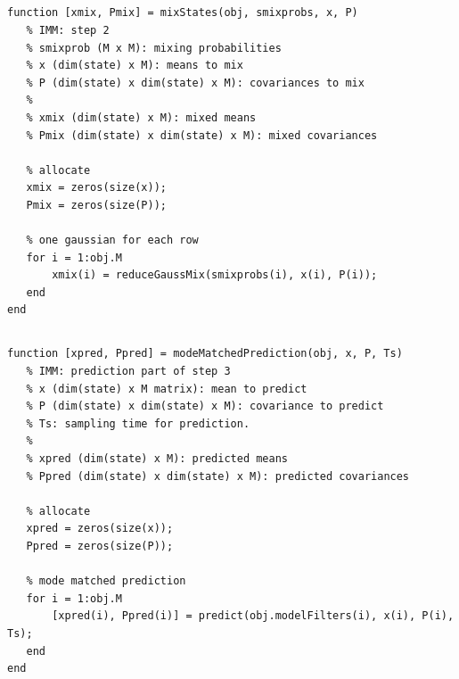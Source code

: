 \documentclass[]{article}
\begin{document}
\subsection{}
\begin{lstlisting}[caption={IMM Step 2}]
function [xmix, Pmix] = mixStates(obj, smixprobs, x, P)
   % IMM: step 2
   % smixprob (M x M): mixing probabilities
   % x (dim(state) x M): means to mix
   % P (dim(state) x dim(state) x M): covariances to mix
   %
   % xmix (dim(state) x M): mixed means
   % Pmix (dim(state) x dim(state) x M): mixed covariances

   % allocate
   xmix = zeros(size(x));
   Pmix = zeros(size(P));

   % one gaussian for each row
   for i = 1:obj.M
       xmix(i) = reduceGaussMix(smixprobs(i), x(i), P(i));
   end
end
\end{lstlisting}

\subsection{}
\begin{lstlisting}[caption={IMM Step 3}]
function [xpred, Ppred] = modeMatchedPrediction(obj, x, P, Ts)
   % IMM: prediction part of step 3
   % x (dim(state) x M matrix): mean to predict
   % P (dim(state) x dim(state) x M): covariance to predict
   % Ts: sampling time for prediction.
   %
   % xpred (dim(state) x M): predicted means
   % Ppred (dim(state) x dim(state) x M): predicted covariances

   % allocate
   xpred = zeros(size(x));
   Ppred = zeros(size(P));

   % mode matched prediction
   for i = 1:obj.M
       [xpred(i), Ppred(i)] = predict(obj.modelFilters(i), x(i), P(i), Ts);
   end
end
\end{lstlisting}
\end{document}
